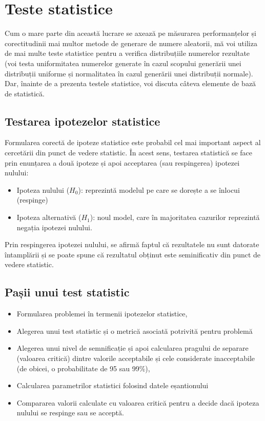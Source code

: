\section{Teste statistice}

Cum o mare parte din această lucrare se axează pe măsurarea performanțelor și corectitudinii mai multor metode de generare de numere aleatorii, mă voi utiliza de mai multe teste statistice pentru a verifica distribuțiile numerelor rezultate (voi testa uniformitatea numerelor generate în cazul scopului generării unei distribuții uniforme și normalitatea în cazul generării unei distribuții normale). Dar, înainte de a prezenta testele statistice, voi discuta câteva elemente de bază de statistică.

\subsection{Testarea ipotezelor statistice}

Formularea corectă de ipoteze statistice este probabil cel mai important aspect al cercetării din punct de vedere statistic. În acest sens, testarea statistică se face prin enunțarea a două ipoteze și apoi acceptarea (sau respingerea) ipotezei nulului:
\begin{itemize}
    \item Ipoteza nulului ($H_0$): reprezintă modelul pe care se dorește a se înlocui (respinge)
    \item Ipoteza alternativă ($H_1$): noul model, care în majoritatea cazurilor reprezintă negația ipotezei nulului.
\end{itemize}

Prin respingerea ipotezei nulului, se afirmă faptul că rezultatele nu sunt datorate întamplării și se poate spune că rezultatul obținut este seminificativ din punct de vedere statistic.

\subsection{Pașii unui test statistic}
\begin{itemize}
    \item Formularea problemei în termenii ipotezelor statistice,
    \item Alegerea unui test statistic și o metrică asociată potrivită pentru problemă
    \item Alegerea unui nivel de semnificație și apoi calcularea pragului de separare (valoarea critică) dintre valorile acceptabile și cele considerate inacceptabile (de obicei, o probabilitate de 95 sau 99\%),
    \item Calcularea parametrilor statistici folosind datele eșantionului
    \item Compararea valorii calculate cu valoarea critică pentru a decide dacă ipoteza nulului se respinge sau se acceptă.
\end{itemize}

